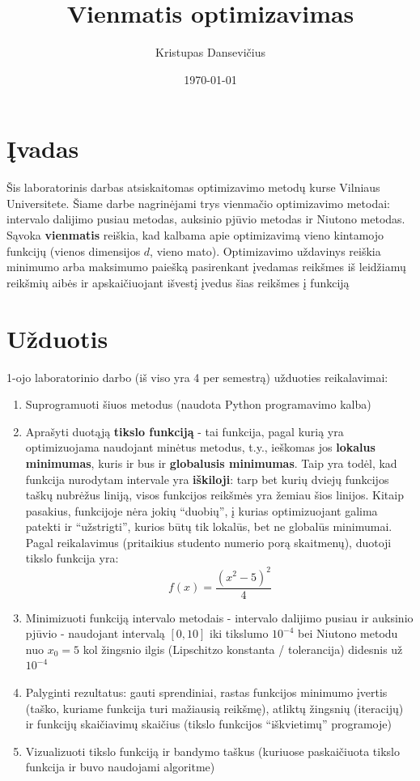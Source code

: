 \documentclass[lithuanian,a4paper,12pt]{article}
\title{Vienmatis optimizavimas}
\author{Kristupas Dansevičius}
\date{\today}
\begin{document}
\maketitle
\tableofcontents

\section{Įvadas}
Šis laboratorinis darbas atsiskaitomas optimizavimo metodų kurse Vilniaus Universitete. Šiame darbe nagrinėjami trys vienmačio optimizavimo metodai: intervalo dalijimo pusiau metodas, auksinio pjūvio metodas ir Niutono metodas. Sąvoka \textbf{vienmatis} reiškia, kad kalbama apie optimizavimą vieno kintamojo funkcijų (vienos dimensijos $d$, vieno mato). Optimizavimo uždavinys reiškia minimumo arba maksimumo paiešką pasirenkant įvedamas reikšmes iš leidžiamų reikšmių aibės ir apskaičiuojant išvestį įvedus šias reikšmes į funkciją 

\section{Užduotis}
1-ojo laboratorinio darbo (iš viso yra 4 per semestrą) užduoties reikalavimai:
\begin{enumerate}
    \item Suprogramuoti šiuos metodus (naudota Python programavimo kalba)
    \item Aprašyti duotąją \textbf{tikslo funkciją} - tai funkcija, pagal kurią yra optimizuojama naudojant minėtus metodus, t.y., ieškomas jos \textbf{lokalus minimumas}, kuris ir bus ir \textbf{globalusis minimumas}. Taip yra todėl, kad funkcija nurodytam intervale yra \textbf{iškiloji}: tarp bet kurių dviejų funkcijos taškų nubrėžus liniją, visos funkcijos reikšmės yra žemiau šios linijos. Kitaip pasakius, funkcijoje nėra jokių ``duobių'', į kurias optimizuojant galima patekti ir ``užstrigti'', kurios būtų tik lokalūs, bet ne globalūs minimumai. Pagal reikalavimus (pritaikius studento numerio porą skaitmenų), duotoji tikslo funkcija yra:
        \begin{equation*}
            f(x) = \frac{(x^2 - 5)^2}{4}
        \end{equation*}
    \item Minimizuoti funkciją intervalo metodais - intervalo dalijimo pusiau ir auksinio pjūvio - naudojant intervalą $[0,10]$ iki tikslumo $10^{-4}$ bei Niutono metodu nuo $x_0 = 5$ kol žingsnio ilgis (Lipschitzo konstanta / tolerancija) didesnis už $10^{-4}$
    \item Palyginti rezultatus: gauti sprendiniai, rastas funkcijos minimumo įvertis (taško, kuriame funkcija turi mažiausią reikšmę), atliktų žingsnių (iteracijų) ir funkcijų skaičiavimų skaičius (tikslo funkcijos ``iškvietimų'' programoje)
    \item Vizualizuoti tikslo funkciją ir bandymo taškus (kuriuose paskaičiuota tikslo funkcija ir buvo naudojami algoritme)
\end{enumerate}
\end{document}
